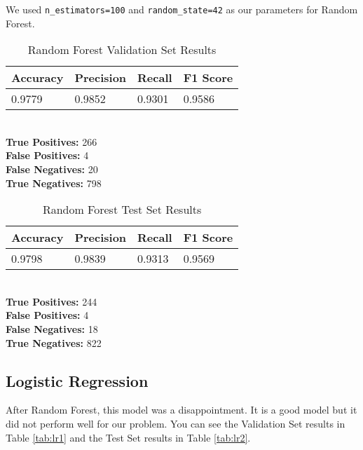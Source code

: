 \documentclass[conference]{IEEEtran}
\begin{document}
We used \verb|n_estimators=100| and \verb|random_state=42| as our parameters for Random Forest.

\begin{table}[H]
    \caption{Random Forest Validation Set Results}

    \begin{tabularx}{\linewidth}{|X|X|X|X|}
        \hline
        \textbf{Accuracy} & \textbf{Precision} & \textbf{Recall} & \textbf{F1 Score} \\
        \hline
        0.9779 & 0.9852 & 0.9301 & 0.9586 \\
        \hline
    \end{tabularx}\\

    \textbf{True Positives:} 266\\
    \textbf{False Positives:} 4\\
    \textbf{False Negatives:} 20\\
    \textbf{True Negatives:} 798
    \label{tab:rf1}
\end{table}

\begin{table}[H]
    \caption{Random Forest Test Set Results}

    \begin{tabularx}{\linewidth}{|X|X|X|X|}
        \hline
        \textbf{Accuracy} & \textbf{Precision} & \textbf{Recall} & \textbf{F1 Score} \\
        \hline
        0.9798 & 0.9839 & 0.9313 & 0.9569 \\
        \hline
    \end{tabularx}\\

    \textbf{True Positives:} 244\\
    \textbf{False Positives:} 4\\
    \textbf{False Negatives:} 18\\
    \textbf{True Negatives:} 822
    \label{tab:rf2}
\end{table}

\subsection{Logistic Regression}
After Random Forest, this model was a disappointment. It is a good model but it did not perform well for our problem. You can see the Validation Set results in Table \ref{tab:lr1} and the Test Set results in Table \ref{tab:lr2}.
\end{document}
